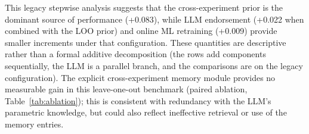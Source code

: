 \documentclass[11pt]{article}
\begin{document}
This legacy stepwise analysis suggests that the cross-experiment prior is the dominant source of
performance (+0.083), while LLM endorsement (+0.022 when combined with the LOO prior) and online ML
retraining (+0.009) provide smaller increments under that configuration. These quantities are descriptive
rather than a formal additive decomposition (the rows add components sequentially, the LLM is a parallel
branch, and the comparisons are on the legacy configuration).
The explicit cross-experiment memory module provides no measurable gain in this leave-one-out benchmark
(paired ablation, Table~\ref{tab:ablation}); this is consistent with redundancy with the LLM's parametric
knowledge, but could also reflect ineffective retrieval or use of the memory entries.

\end{document}
